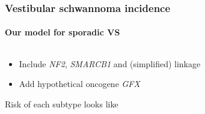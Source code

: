 \documentclass{beamer}
\begin{document}

\begin{frame}
    \frametitle{Vestibular schwannoma incidence}
    \framesubtitle{Our model for sporadic VS}

    \begin{columns}
        \begin{column}{0.5\textwidth}
        \begin{itemize}
            \item Include \emph{NF2}, \emph{SMARCB1} and (simplified) linkage
            \item Add hypothetical oncogene \emph{GFX}
        \end{itemize}

        \;

        Risk of each subtype looks like


\end{column}
\end{columns}
\end{frame}
\end{document}
